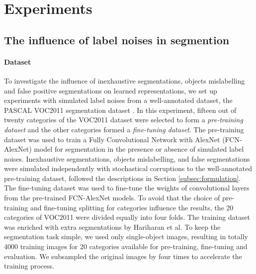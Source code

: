 \section{Experiments}
\label{sec:experiments}

\subsection{The influence of label noises in segmention}
\label{subsec:robustness}


\paragraph{Dataset}
To investigate the influence of inexhaustive segmentations, objects mislabelling and false positive segmentations on learned representations, we set up experiments with simulated label noises from a well-annotated dataset, the PASCAL VOC2011 segmentation dataset \cite{everingham2015pascal}.
In this experiment, fifteen out of twenty categories of the VOC2011 dataset were selected to form a \textit{pre-training dataset} and the other categories formed a \textit{fine-tuning dataset}.
The pre-training dataset was used to train a Fully Convolutional Network with AlexNet (FCN-AlexNet) model \cite{long2015fully} for segmentation in the presence or absence of simulated label noises.
Inexhaustive segmentations, objects mislabelling, and false segmentations were simulated independently with stochastical corruptions to the well-annotated pre-training dataset, followed the descriptions in Section \ref{subsec:formulation}.
The fine-tuning dataset was used to fine-tune the weights of convolutional layers from the pre-trained FCN-AlexNet models.
To avoid that the choice of pre-training and fine-tuning splitting for categories influence the results, the 20 categories of VOC2011 were divided equally into four folds.
The training dataset was enriched with extra segmentations by Hariharan et al. \cite{hariharan2011semantic}
To keep the segmentation task simple, we used only single-object images, resulting in totally 4000 training images for 20 categories available for pre-training, fine-tuning and evaluation.
We subsampled the original images by four times to accelerate the training process.


